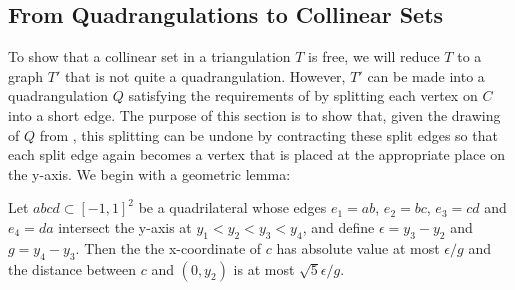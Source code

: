 \documentclass{patmorin}
\begin{document}
\subsection{From Quadrangulations to Collinear Sets}

To show that a collinear set in a triangulation $T$ is free, we will
reduce $T$ to a graph $T'$ that is not quite a quadrangulation.  However,
$T'$ can be made into a quadrangulation $Q$ satisfying the requirements
of  by splitting each vertex on $C$ into a short edge. The
purpose of this section is to show that, given the drawing of $Q$ from
, this splitting can be undone by contracting these split
edges so that each split edge again becomes a vertex that is placed at
the appropriate place on the y-axis.  We begin with a geometric lemma:

\begin{lem}
  Let $abcd\subset[-1,1]^2$ be a quadrilateral whose edges
  $e_1=ab$, $e_2=bc$, $e_3=cd$ and $e_4=da$ intersect the y-axis at
  $y_1<y_2<y_3<y_4$, and define $\epsilon=y_3-y_2$ and $g=y_4-y_3$.  Then
  the the x-coordinate of $c$ has absolute value at most $\epsilon/g$ and
  the distance between $c$ and $(0,y_2)$ is at most $\sqrt{5}\epsilon/g$.
\end{lem}
\end{document}
